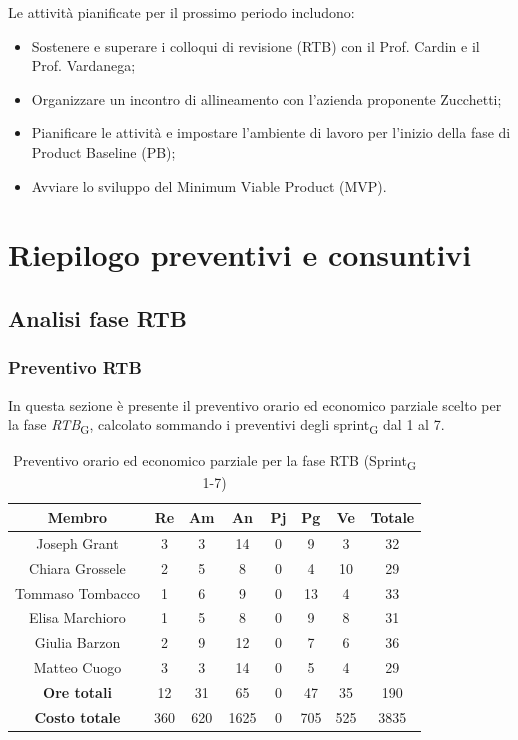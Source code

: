 \documentclass[11pt,a4paper]{article}
\newcommand{\gls}[1]{#1\textsubscript{G}}
\begin{document}
Le attività pianificate per il prossimo periodo includono:
\begin{itemize}
    \item Sostenere e superare i colloqui di revisione (RTB) con il Prof. Cardin e il Prof. Vardanega;
    \item Organizzare un incontro di allineamento con l'azienda proponente Zucchetti;
    \item Pianificare le attività e impostare l'ambiente di lavoro per l'inizio della fase di Product Baseline (PB);
    \item Avviare lo sviluppo del Minimum Viable Product (MVP).
\end{itemize}
\newpage

\section{Riepilogo preventivi e consuntivi}

\subsection{Analisi fase RTB}

\subsubsection{Preventivo RTB}
In questa sezione è presente il preventivo orario ed economico parziale scelto per la fase \textit{RTB}\textsubscript{G}, calcolato sommando i preventivi degli \gls{sprint} dal 1 al 7.

\begin{table}[H]
    \centering
    \begin{tabular}{|c|c|c|c|c|c|c|c|}
        \hline
        \textbf{Membro} & \textbf{Re} & \textbf{Am} & \textbf{An} & \textbf{Pj} & \textbf{Pg} & \textbf{Ve} & \textbf{Totale} \\
        \hline
        Joseph Grant & 3 & 3 & 14 & 0 & 9 & 3 & 32 \\
        Chiara Grossele & 2 & 5 & 8 & 0 & 4 & 10 & 29 \\
        Tommaso Tombacco & 1 & 6 & 9 & 0 & 13 & 4 & 33 \\
        Elisa Marchioro & 1 & 5 & 8 & 0 & 9 & 8 & 31 \\
        Giulia Barzon & 2 & 9 & 12 & 0 & 7 & 6 & 36 \\
        Matteo Cuogo & 3 & 3 & 14 & 0 & 5 & 4 & 29 \\
        \hline
        \textbf{Ore totali} & 12 & 31 & 65 & 0 & 47 & 35 & 190 \\
        \hline
        \textbf{Costo totale} & 360 & 620 & 1625 & 0 & 705 & 525 & 3835 \\
        \hline
    \end{tabular}
    \caption{Preventivo orario ed economico parziale per la fase RTB (\gls{Sprint} 1-7)}
\end{table}
\end{document}
